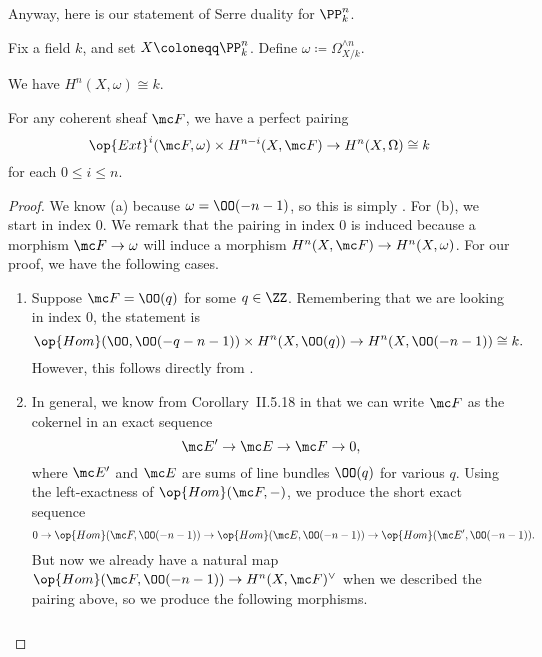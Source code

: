 \documentclass[../notes.tex]{subfiles}
\begin{document}
Anyway, here is our statement of Serre duality for $\PP^n_k$.
\begin{theorem} \label{thm:serre-duality-pn}
	Fix a field $k$, and set $X\coloneqq\PP^n_k$. Define $\omega\coloneqq\Omega_{X/k}^{\land n}$.
	\begin{listalph}
		\item We have $H^n(X,\omega)\cong k$.
		\item For any coherent sheaf $\mc F$, we have a perfect pairing
		\[\op{Ext}^i(\mc F,\omega)\times H^{n-i}(X,\mc F)\to H^n(X,\Omega)\cong k\]
		for each $0\le i\le n$.
	\end{listalph}
\end{theorem}
\begin{proof}
	We know (a) because $\omega=\OO(-n-1)$, so this is simply . For (b), we start in index $0$. We remark that the pairing in index $0$ is induced because a morphism $\mc F\to\omega$ will induce a morphism $H^n(X,\mc F)\to H^n(X,\omega)$. For our proof, we have the following cases.
	\begin{enumerate}
		\item Suppose $\mc F=\OO(q)$ for some $q\in\ZZ$. Remembering that we are looking in index $0$, the statement is
		\[\op{Hom}(\OO,\OO(-q-n-1))\times H^n(X,\OO(q))\to H^n(X,\OO(-n-1))\cong k.\]
		However, this follows directly from .
		\item In general, we know from Corollary~II.5.18 in \cite{hartshorne} that we can write $\mc F$ as the cokernel in an exact sequence
		\[\mc E'\to\mc E\to\mc F\to0,\]
		where $\mc E'$ and $\mc E$ are sums of line bundles $\OO(q)$ for various $q$. Using the left-exactness of $\op{Hom}(\mc F,-)$, we produce the short exact sequence
		\[0\to\op{Hom}(\mc F,\OO(-n-1))\to\op{Hom}(\mc E,\OO(-n-1))\to\op{Hom}(\mc E',\OO(-n-1)).\]
		But now we already have a natural map $\op{Hom}(\mc F,\OO(-n-1))\to H^n(X,\mc F)^\lor$ when we described the pairing above, so we produce the following morphisms.
		\[\begin{tikzcd}

\end{tikzcd}\]
\end{enumerate}
\end{proof}
\end{document}
